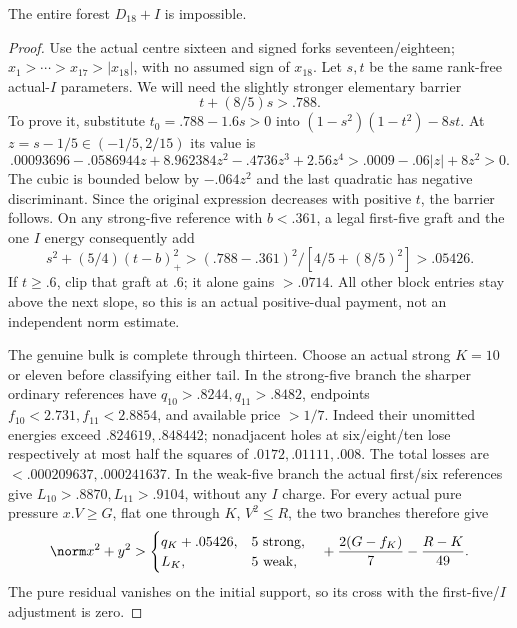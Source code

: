 \begin{lemma}\label{app:tail:lem:D18I}
The entire forest $D_{18}+I$ is impossible.
\end{lemma}
\begin{proof}
Use the actual centre sixteen and signed forks seventeen/eighteen;
$x_1>\cdots>x_{17}>|x_{18}|$, with no assumed sign of $x_{18}$.
Let $s,t$ be the same rank-free actual-$I$ parameters.
We will need the slightly stronger elementary barrier
\begin{equation}\label{app:tail:eq:I788}
 t+(8/5)s>.788.
\end{equation}
To prove it, substitute $t_0=.788-1.6s>0$ into
$(1-s^2)(1-t^2)-8st$.
At $z=s-1/5\in(-1/5,2/15)$ its value is
\[
 .00093696-.0586944z+8.962384z^2-.4736z^3+2.56z^4
 >.0009-.06|z|+8z^2>0.
\]
The cubic is bounded below by $-.064z^2$ and the last
quadratic has negative discriminant. Since the original
expression decreases with positive $t$, the barrier follows.
On any strong-five reference with $b<.361$, a legal first-five
graft and the one $I$ energy consequently add
\[
 s^2+(5/4)(t-b)_+^2>
 (.788-.361)^2/[4/5+(8/5)^2]>.05426.
\]
If $t\ge.6$, clip that graft at $.6$; it alone gains $>.0714$.
All other block entries stay above the next slope, so this is
an actual positive-dual payment, not an independent norm estimate.

The genuine bulk is complete through thirteen. Choose an actual
strong $K=10$ or eleven before classifying either tail.
In the strong-five branch the sharper ordinary references have
$q_{10}>.8244,q_{11}>.8482$, endpoints
$f_{10}<2.731,f_{11}<2.8854$, and available price $>1/7$.
Indeed their unomitted energies exceed $.824619,.848442$;
nonadjacent holes at six/eight/ten lose respectively at most
half the squares of $.0172,.01111,.008$.
The total losses are $<.000209637,.000241637$.
In the weak-five branch the actual first/six references give
$L_{10}>.8870,L_{11}>.9104$, without any $I$ charge.
For every actual pure pressure $x.V\ge G$, flat one through
$K$, $V^2\le R$, the two branches therefore give
\begin{equation}\label{app:tail:eq:D18Ipurepay}
 \norm x^2+y^2>
 \begin{cases}q_K+.05426,&5\text{ strong},\\L_K,&5\text{ weak},\end{cases}
 \quad +{2(G-f_K)\over7}-{R-K\over49}.
\end{equation}
The pure residual vanishes on the initial support, so its
cross with the first-five/$I$ adjustment is zero.


\end{proof}
